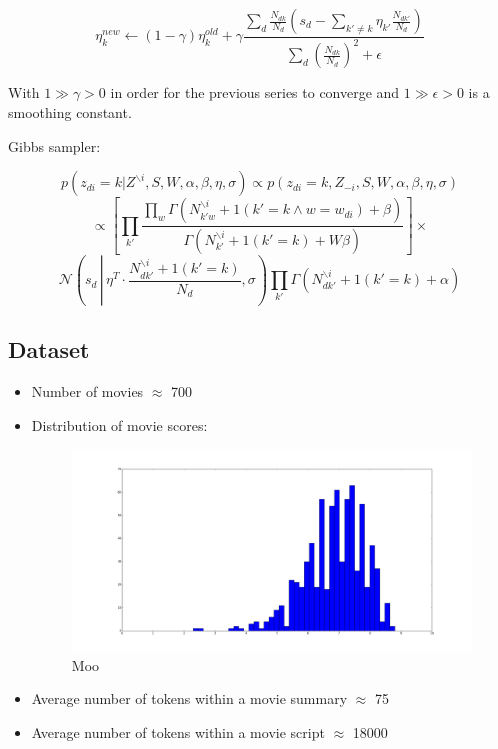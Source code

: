 \documentclass[a4paper,10pt]{report}
\begin{document}
$$ \eta_k^{new} \leftarrow (1 - \gamma) \eta_k^{old} + \gamma \frac{\sum_d \frac{N_{dk}}{N_d} \left( s_d - \sum_{k' \ne k} \eta_{k'} \frac{N_{dk'}}{N_d} \right)}{\sum_d \left( \frac{N_{dk}}{N_d}  \right)^2 + \epsilon}$$

With $1 \gg \gamma > 0$ in order for the previous series to converge and $1 \gg \epsilon > 0$ is a smoothing constant.

Gibbs sampler:

$$ p(z_{di} = k | Z^{\backslash i}, S, W, \alpha, \beta, \eta, \sigma) \propto p(z_{di} = k, Z_{-i}, S, W, \alpha, \beta, \eta, \sigma) $$
$$ \propto \left[ \prod_{k'} \frac{\prod_w \Gamma(N_{{k'}w}^{\backslash i} + 1(k' = k \wedge w = w_{di}) + \beta)}{\Gamma(N_{k'}^{\backslash i} + 1(k' = k) + W \beta)} \right] \times $$
$$ \mathcal{N}\left(s_d\, \left|\, \eta^T \cdot \frac{N_{d{k'}}^{\backslash i} + 1(k' = k)}{N_d}, \sigma\right. \right) \prod_{k'} \Gamma(N_{d{k'}}^{\backslash i} + 1(k' = k) + \alpha) $$

\subsection*{Dataset}

\begin{itemize}
	\item Number of movies $\approx$ 700
	\item Distribution of movie scores:
	
	\begin{figure}[ht!]
		\centering
		\includegraphics[width=\textwidth]{scores_histogram.png}
		
		\caption{Moo}
	\end{figure}

	\item Average number of tokens within a movie summary $\approx$ 75
	\item Average number of tokens within a movie script $\approx$ 18000
\end{itemize}
\end{document}
